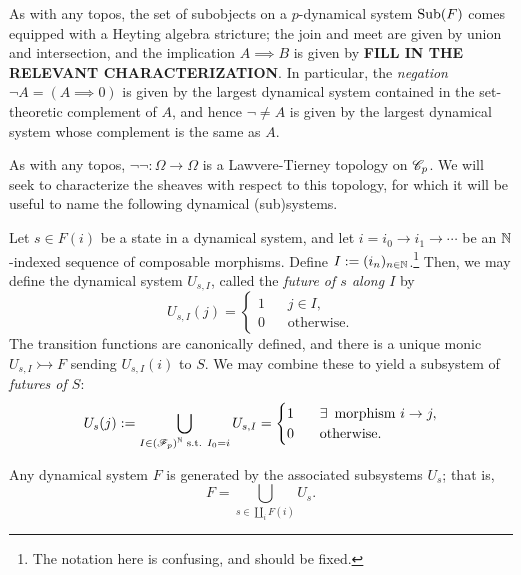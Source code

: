 \documentclass{amsart}
\begin{document}
As with any topos, the set of subobjects on a $p$-dynamical system $\operatorname{Sub}(F)$ comes equipped with a Heyting algebra stricture;
the join and meet are given by union and intersection, and the implication $A \implies B$ is given by \textbf{FILL IN THE RELEVANT CHARACTERIZATION}.
In particular, the \emph{negation} $\neg A = (A \implies 0)$ is given by the largest dynamical system contained in the set-theoretic complement of $A$, and hence $\neg \neq A$ is given by the largest dynamical system whose complement is the same as $A$.

As with any topos, $\neg \neg:\Omega \rightarrow \Omega$ is a Lawvere-Tierney topology on $\mathscr{C}_p$.
We will seek to characterize the sheaves with respect to this topology, for which it will be useful to name the following dynamical (sub)systems.

\begin{example}
  Let $s \in F(i)$ be a state in a dynamical system, and let $i = i_0 \rightarrow i_1 \rightarrow \cdots$ be an $\mathbb{N}$-indexed sequence of composable morphisms.
  Define $I := (i_n)_{n \in \mathbb{N}}$.\footnote{\color{magenta} The notation here is confusing, and should be fixed.}
  Then, we may define the dynamical system $U_{s,I}$, called the \emph{future of $s$ along $I$} by
  \[
    U_{s,I}(j) = \begin{cases}
      1 & \;\;\; j \in I,\\
      0 & \;\;\; \text{otherwise.} 
    \end{cases}
  \]
  The transition functions are canonically defined, and there is a unique monic $U_{s,I} \rightarrowtail F$ sending $U_{s,I}(i)$ to $S$.
  We may combine these to yield a subsystem of \emph{futures of $S$}: 
  \[
    U_s(j) := \bigcup_{I \in \left( \mathscr{F}_p \right)^{\mathbb{N}} \text{ s.t. } I_0 = i} U_{s,I} = \begin{cases}
      1 & \;\;\; \exists \, \text{ morphism } i \rightarrow j,\\
      0 & \;\;\; \text{otherwise.} 
    \end{cases}
  \]

  \begin{lemma}
    Any dynamical system $F$ is generated by the associated subsystems $U_{s}$;
    that is, 
    \[
      F = \bigcup_{s \in \coprod_i F(i)} U_{s}.
    \]
  \end{lemma}


\end{example}
\end{document}

